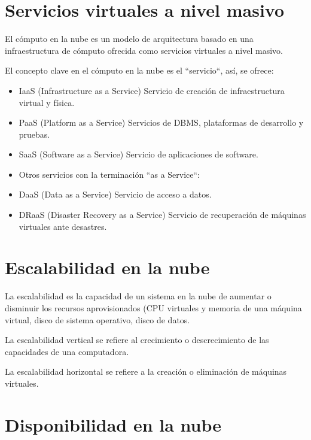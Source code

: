 \documentclass[11pt,a4paper,oneside]{book}
\begin{document}
\section{Servicios virtuales a nivel masivo}

El cómputo en la nube es un modelo de arquitectura basado en una infraestructura de cómputo ofrecida como servicios virtuales a nivel masivo.

El concepto clave en el cómputo en la nube es el ``servicio``, así, se ofrece:

\begin{itemize}

\item IaaS (Infrastructure as a Service) Servicio de creación de infraestructura virtual y física.

\item PaaS (Platform as a Service) Servicios de DBMS, plataformas de desarrollo y pruebas.

\item SaaS (Software as a Service) Servicio de aplicaciones de software.

\item Otros servicios con la terminación ``as a Service``:

\item DaaS (Data as a Service) Servicio de acceso a datos.

\item DRaaS (Disaster Recovery as a Service) Servicio de recuperación de máquinas virtuales ante desastres.

\end{itemize}

\section{Escalabilidad en la nube}

La escalabilidad es la capacidad de un sistema en la nube de aumentar o disminuir los recursos aprovisionados (CPU virtuales y memoria de una máquina virtual, disco de sistema operativo, disco de datos.

La escalabilidad vertical se refiere al crecimiento o descrecimiento de las capacidades de una computadora.

La escalabilidad horizontal se refiere a la creación o eliminación de máquinas virtuales.

\section{Disponibilidad en la nube}
\end{document}

